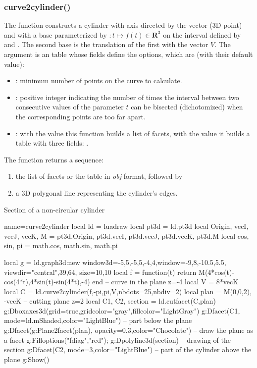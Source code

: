 \subsubsection{curve2cylinder()}

The function  constructs a cylinder with axis directed by the vector  (3D point) and with a base parameterized by $\colon t\mapsto f(t)\in\mathbf R^3$ on the interval defined by  and . The second base is the translation of the first with the vector $V$. The argument  is an table whose fields define the options, which are (with their default value):
\begin{itemize}
    \item {}: minimum number of points on the curve to calculate.
    
    \item {}: positive integer indicating the number of times the interval between two consecutive values ​​of the parameter $t$ can be bisected (dichotomized) when the corresponding points are too far apart.
    
    \item {} : with the value \false this function builds a list of facets, with the value \true it builds a table with three fields: .
\end{itemize}
The function returns a sequence:
\begin{enumerate}
    \item the list of facets or the table in \emph{obj} format, followed by
    \item a 3D polygonal line representing the cylinder's edges.
\end{enumerate}

\begin{demo}{Section of a non-circular cylinder}
\begin{luadraw}{name=curve2cylinder}
local ld = luadraw
local pt3d = ld.pt3d
local Origin, vecI, vecJ, vecK, M = pt3d.Origin, pt3d.vecI, pt3d.vecJ, pt3d.vecK, pt3d.M
local cos, sin, pi = math.cos, math.sin, math.pi

local g = ld.graph3d:new{ window3d={-5,5,-5,5,-4,4},window={-9,8,-10.5,5.5},
    viewdir={"central",39,64}, size={10,10}}
local f = function(t) return M(4*cos(t)-cos(4*t),4*sin(t)-sin(4*t),-4) end -- curve in the plane z=-4
local V = 8*vecK
local C = ld.curve2cylinder(f,-pi,pi,V,{nbdots=25,nbdiv=2})
local plan = {M(0,0,2), -vecK} -- cutting plane z=2
local C1, C2, section = ld.cutfacet(C,plan)
g:Dboxaxes3d({grid=true,gridcolor="gray",fillcolor="LightGray"})
g:Dfacet(C1, {mode=ld.mShaded,color="LightBlue"}) -- part below the plane
g:Dfacet(g:Plane2facet(plan), {opacity=0.3,color="Chocolate"}) -- draw the plane as a facet
g:Filloptions("fdiag","red"); g:Dpolyline3d(section) -- drawing of the section
g:Dfacet(C2, {mode=3,color="LightBlue"}) -- part of the cylinder above the plane
g:Show()
\end{luadraw}
\end{demo}


